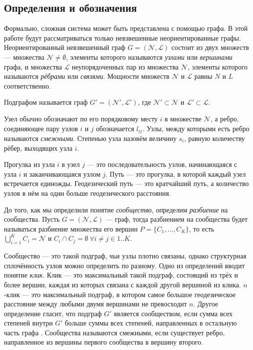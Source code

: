 
\subsection{Определения и обозначения}

Формально, сложная система может быть представлена с помощью графа. В этой работе будут рассматриваться только невзвешенные неориентированные графы. Неориентированный невзвешенный граф $G = (\mathscr{N}, \mathscr{L})$ состоит из двух множеств --- множества $\mathscr{N} \ne \emptyset$, элементы которого называются \emph{узлами} или \emph{вершинами} графа, и множества $\mathscr{L}$ неупорядоченных пар из множества $\mathscr{N}$, элементы которого называются \emph{рёбрами} или \emph{связями}. Мощности множеств $\mathscr{N}$ и $\mathscr{L}$ равны $N$ и $L$ соответственно.

Подграфом называется граф $G' = (\mathscr{N}', \mathscr{L}')$, где $\mathscr{N}' \subset \mathscr{N}$ и $\mathscr{L}' \subset \mathscr{L}$.

Узел обычно обозначают по его порядковому месту $i$ в множестве $\mathscr{N}$, а ребро, соединяющее пару узлов $i$ и $j$ обозначается $l_{ij}$. Узлы, между которыми есть ребро называются \emph{смежными}. Степенью узла назовём величину $s_i$, равную количеству рёбер, выходящих узла $i$.

Прогулка из узла $i$ в узел $j$ --- это последовательность узлов, начинающаяся с узла $i$ и заканчивающаяся узлом $j$. Путь --- это прогулка, в которой каждый узел встречается единожды. Геодезический путь --- это кратчайший путь, а количество узлов в нём на один больше геодезического расстояния.

До того, как мы определили понятие \emph{сообщество}, определим \emph{разбиение} на сообщества. Пусть $G = (\mathscr{N}, \mathscr{L})$ --- граф, тогда разбиением на сообщества будет называться разбиение множества его вершин $P = \{C_1, \dots, C_K\}$, то есть $\bigcup_{i = 1}^K C_i = \mathscr{N}$ и $C_i \cap C_j = \emptyset \ \forall i \neq j \in 1..K$.

Сообщество --- это такой подграф, чьи узлы плотно связаны, однако структурная сплочённость узлов можно определить по разному. Одно из определений вводит понятие \emph{клик}. Клик --- это максимальный такой подграф, состоящий из трёх и более вершин, каждая из которых связана с каждой другой вершиной из клика. $n$-клик --- это максимальный подграф, в котором самое большое геодезическое расстояние между любыми двумя вершинами не превосходит $n$. Другое определение гласит, что подграф $G'$ является сообществом, если сумма всех степеней внутри $G'$ больше суммы всех степеней, направленных в остальную часть графа \cite{Wasserman:1994}. Сообщества называются смежными, если существует ребро, направленное из вершины первого сообщества в вершину второго.


